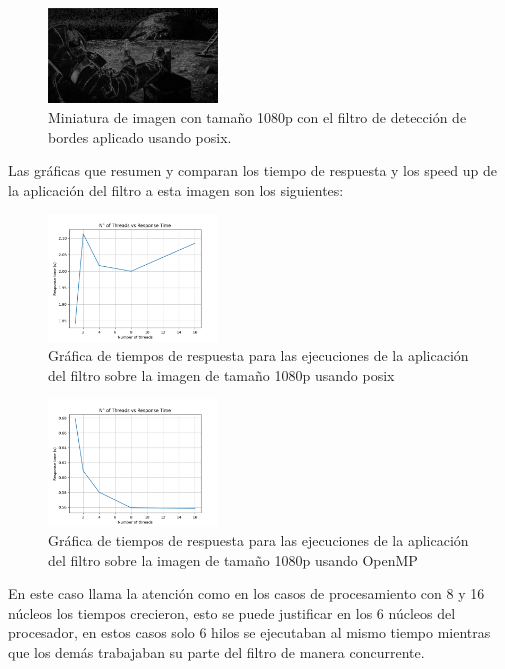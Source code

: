 \begin{figure}[H]
    \centering
    \includegraphics[width=0.4\textwidth]{../plots/1080p.out.jpg}
    \caption{Miniatura de imagen con tamaño 1080p con el filtro de detección de bordes aplicado usando posix.}
\end{figure}

Las gráficas que resumen y comparan los tiempo de respuesta y los speed up de la aplicación del filtro a esta imagen son los siguientes:

\begin{figure}[H]
    \centering
    \includegraphics[width=0.4\textwidth]{../plots/1080p_response_time.png}
    \caption{Gráfica de tiempos de respuesta para las ejecuciones de la aplicación del filtro sobre la imagen de tamaño 1080p usando posix}
\end{figure}

\begin{figure}[H]
    \centering
    \includegraphics[width=0.4\textwidth]{../plots/omp_1080p_response_time.png}
    \caption{Gráfica de tiempos de respuesta para las ejecuciones de la aplicación del filtro sobre la imagen de tamaño 1080p usando OpenMP}
\end{figure}

En este caso llama la atención como en los casos de procesamiento con 8 y 16 núcleos los tiempos crecieron, esto se puede justificar en los 6 núcleos del procesador, en estos casos solo 6 hilos se ejecutaban al mismo tiempo mientras que los demás trabajaban su parte del filtro de manera concurrente.

